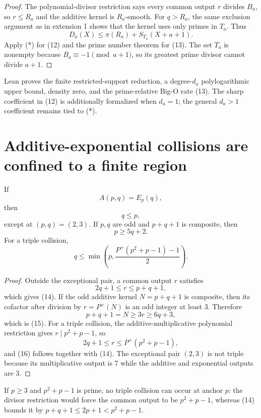 \documentclass[10pt,a4paper]{scrartcl}
\begin{document}
\begin{proof}
The polynomial-divisor restriction says every common output $r$ divides $B_a$, so $r\le R_a$ and the additive kernel is $R_a$-smooth. For $q>R_a$, the same exclusion argument as in extension 1 shows that the kernel uses only primes in $T_a$. Thus
\[
D_a(X)\le\pi(R_a)+S_{T_a}(X+a+1).
\]
Apply (*) for (12) and the prime number theorem for (13). The set $T_a$ is nonempty because $B_a\equiv-1\pmod{a+1}$, so its greatest prime divisor cannot divide $a+1$.
\end{proof}

Lean proves the finite restricted-support reduction, a degree-$d_a$ polylogarithmic upper bound, density zero, and the prime-relative Big-O rate (13). The sharp coefficient in (12) is additionally formalized when $d_a=1$; the general $d_a>1$ coefficient remains tied to (*).

\section{Additive-exponential collisions are confined to a finite region}

If
\[
A(p,q)=E_p(q),
\]
then
\begin{equation}
q\le p, \tag{14}
\end{equation}
except at $(p,q)=(2,3)$. If $p,q$ are odd and $p+q+1$ is composite, then
\begin{equation}
p\ge5q+2. \tag{15}
\end{equation}
For a triple collision,
\begin{equation}
q\le\min\!\left(p,\frac{P^+(p^2+p-1)-1}{2}\right). \tag{16}
\end{equation}

\begin{proof}
Outside the exceptional pair, a common output $r$ satisfies
\[
2q+1\le r\le p+q+1,
\]
which gives (14). If the odd additive kernel $N=p+q+1$ is composite, then its cofactor after division by $r=P^+(N)$ is an odd integer at least 3. Therefore
\[
p+q+1=N\ge3r\ge6q+3,
\]
which is (15). For a triple collision, the additive-multiplicative polynomial restriction gives $r\mid p^2+p-1$, so
\[
2q+1\le r\le P^+(p^2+p-1),
\]
and (16) follows together with (14). The exceptional pair $(2,3)$ is not triple because its multiplicative output is 7 while the additive and exponential outputs are 3.
\end{proof}

If $p\ge3$ and $p^2+p-1$ is prime, no triple collision can occur at anchor $p$: the divisor restriction would force the common output to be $p^2+p-1$, whereas (14) bounds it by $p+q+1\le2p+1<p^2+p-1$.
\end{document}

